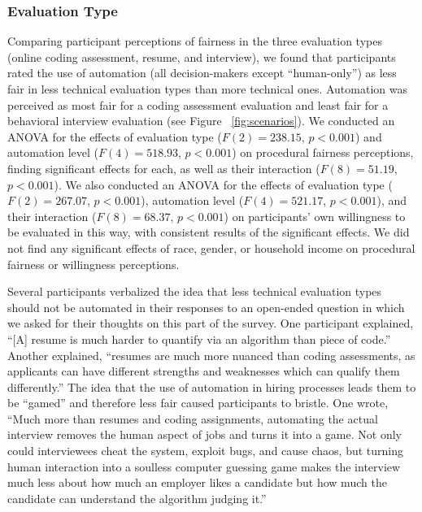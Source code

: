 \subsubsection{Evaluation Type} Comparing participant perceptions of fairness in the three evaluation types (online coding assessment, resume, and interview), we found that participants rated the use of automation (all decision-makers except ``human-only'') as less fair in less technical evaluation types than more technical ones. Automation was perceived as most fair for a coding assessment evaluation and least fair for a behavioral interview evaluation (see Figure ~\ref{fig:scenarios}). We conducted an ANOVA for the effects of evaluation type ($F(2) = 238.15$, $p < 0.001$) and automation level ($F(4) = 518.93$, $p < 0.001$) on procedural fairness perceptions, finding significant effects for each, as well as their interaction ($F(8) = 51.19$, $p < 0.001$). We also conducted an ANOVA for the effects of evaluation type ($F(2) = 267.07$, $p < 0.001$), automation level ($F(4) = 521.17$, $p < 0.001$), and their interaction ($F(8) = 68.37$, $p < 0.001$) on participants' own willingness to be evaluated in this way, with consistent results of the significant effects.
We did not find any significant effects of race, gender, or household income on procedural fairness or willingness perceptions.

Several participants verbalized the idea that less technical evaluation types should not be automated in their responses to an open-ended question in which we asked for their thoughts on this part of the survey. One participant explained, ``[A] resume is much harder to quantify via an algorithm than piece of code.'' Another explained, ``resumes are much more nuanced than coding assessments, as applicants can have different strengths and weaknesses which can qualify them differently.''
The idea that the use of automation in hiring processes leads them to be ``gamed'' and therefore less fair caused participants to bristle.
One wrote, ``Much more than resumes and coding assignments, automating the actual interview removes the human aspect of jobs and turns it into a game. Not only could interviewees cheat the system, exploit bugs, and cause chaos, but turning human interaction into a soulless computer guessing game makes the interview much less about how much an employer likes a candidate but how much the candidate can understand the algorithm judging it.''

